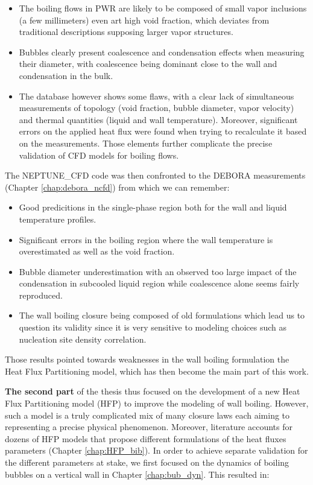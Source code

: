 \begin{itemize}
\item The boiling flows in PWR are likely to be composed of small vapor inclusions (a few millimeters) even art high void fraction, which deviates from traditional descriptions supposing larger vapor structures.
\item Bubbles clearly present coalescence and condensation effects when measuring their diameter, with coalescence being dominant close to the wall and condensation in the bulk.
\item The database however shows some flaws, with a clear lack of simultaneous measurements of topology (void fraction, bubble diameter, vapor velocity) and thermal quantities (liquid and wall temperature). Moreover, significant errors on the applied heat flux were found when trying to recalculate it based on the measurements. Those elements further complicate the precise validation of CFD models for boiling flows. 
\end{itemize}

The NEPTUNE\_CFD code was then confronted to the DEBORA measurements (Chapter \ref{chap:debora_ncfd}) from which we can remember:

\begin{itemize}
\item Good predicitions in the single-phase region both for the wall and liquid temperature profiles.
\item Significant errors in the boiling region where the wall temperature is overestimated as well as the void fraction.
\item Bubble diameter underestimation with an observed too large impact of the condensation in subcooled liquid region while coalescence alone seems fairly reproduced.
\item The wall boiling closure being composed of old formulations which lead us to question its validity since it is very sensitive to modeling choices such as nucleation site density correlation. 
\end{itemize}

Those results pointed towards weaknesses in the wall boiling formulation \ie the Heat Flux Partitioning model, which has then become the main part of this work.

\npar

\textbf{The second part} of the thesis thus focused on the development of a new Heat Flux Partitioning model (HFP) to improve the modeling of wall boiling. However, such a model is a truly complicated mix of many closure laws each aiming to representing a precise physical phenomenon. Moreover, literature accounts for dozens of HFP models that propose different formulations of the heat fluxes parameters (Chapter \ref{chap:HFP_bib}). In order to achieve separate validation for the different parameters at stake, we first focused on the dynamics of boiling bubbles on a vertical wall in Chapter \ref{chap:bub_dyn}. This resulted in:

